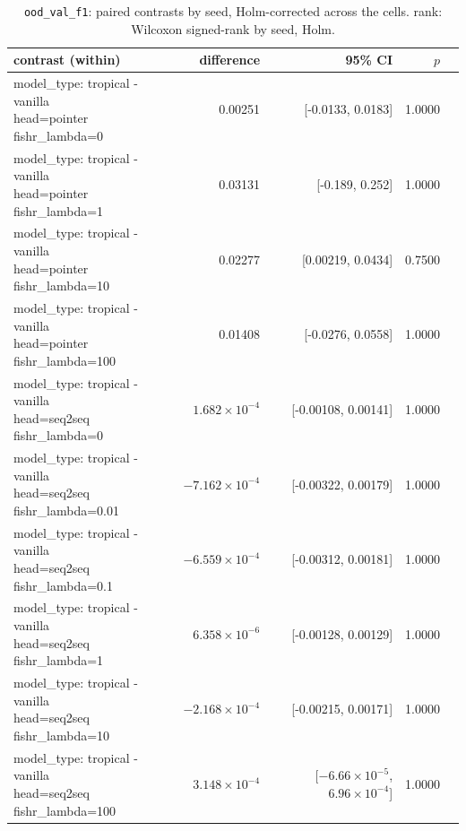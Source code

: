 \documentclass[10pt]{article}
\makeatletter
\newcommand{\stackcell}[1]{\begin{tabular}[t]{@{}l@{}}#1\end{tabular}}
\makeatother
\begin{document}
{\small
\begin{longtable}{lrrrl}
\caption{\texttt{ood\_val\_f1}: paired contrasts by seed, Holm-corrected across the cells. rank: Wilcoxon signed-rank by seed, Holm.}\label{tab:paired-ood_val_f1}\\
\toprule
contrast (within) & difference & 95\% CI & $p$ & \\
\midrule
\endhead
\stackcell{model\_type: tropical - vanilla\\\footnotesize head=pointer fishr\_lambda=0 } & 0.00251 & [-0.0133, 0.0183] & 1.0000 & \\
\stackcell{model\_type: tropical - vanilla\\\footnotesize head=pointer fishr\_lambda=1 } & 0.03131 & [-0.189, 0.252] & 1.0000 & \\
\stackcell{model\_type: tropical - vanilla\\\footnotesize head=pointer fishr\_lambda=10 } & 0.02277 & [0.00219, 0.0434] & 0.7500 & \\
\stackcell{model\_type: tropical - vanilla\\\footnotesize head=pointer fishr\_lambda=100 } & 0.01408 & [-0.0276, 0.0558] & 1.0000 & \\
\stackcell{model\_type: tropical - vanilla\\\footnotesize head=seq2seq fishr\_lambda=0 } & $1.682\times10^{-4}$ & [-0.00108, 0.00141] & 1.0000 & \\
\stackcell{model\_type: tropical - vanilla\\\footnotesize head=seq2seq fishr\_lambda=0.01 } & $-7.162\times10^{-4}$ & [-0.00322, 0.00179] & 1.0000 & \\
\stackcell{model\_type: tropical - vanilla\\\footnotesize head=seq2seq fishr\_lambda=0.1 } & $-6.559\times10^{-4}$ & [-0.00312, 0.00181] & 1.0000 & \\
\stackcell{model\_type: tropical - vanilla\\\footnotesize head=seq2seq fishr\_lambda=1 } & $6.358\times10^{-6}$ & [-0.00128, 0.00129] & 1.0000 & \\
\stackcell{model\_type: tropical - vanilla\\\footnotesize head=seq2seq fishr\_lambda=10 } & $-2.168\times10^{-4}$ & [-0.00215, 0.00171] & 1.0000 & \\
\stackcell{model\_type: tropical - vanilla\\\footnotesize head=seq2seq fishr\_lambda=100 } & $3.148\times10^{-4}$ & [$-6.66\times10^{-5}$, $6.96\times10^{-4}$] & 1.0000 & \\

\end{longtable}}
\end{document}
